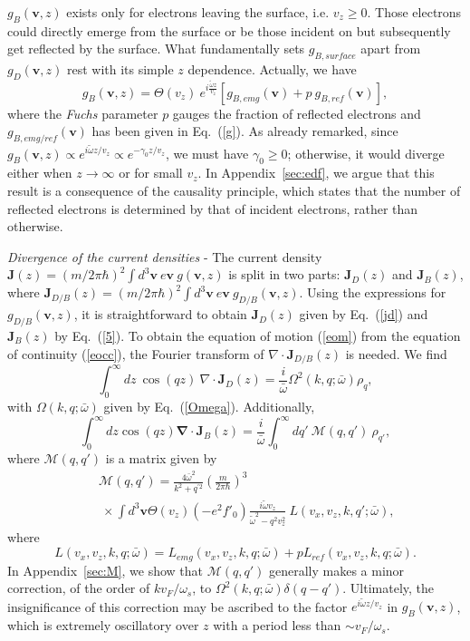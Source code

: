 \documentclass[aps,reprint]{revtex4-1}
\begin{document}
$g_{B}(\mathbf{v},z)$ exists only for electrons leaving the surface, i.e. $v_z\geq0$. Those electrons could directly emerge from the surface or be those incident on but subsequently get reflected by the surface. What fundamentally sets $g_{B,surface}$ apart from $g_D(\mathbf{v},z)$ rest with its simple $z$ dependence. Actually, we have $$g_{B}(\mathbf{v},z) = \Theta(v_z)~e^{i\frac{\tilde{\omega}z}{v_z}}\left[g_{B,emg}(\mathbf{v})+p~g_{B,ref}(\mathbf{v})\right],$$ where the \textit{Fuchs} parameter $p$ gauges the fraction of reflected electrons and $g_{B,emg/ref}(\mathbf{v})$ has been given in Eq.~(\ref{g}). As already remarked, since $g_B(\mathbf{v},z) \propto e^{i\tilde{\omega}z/v_z}\propto e^{-\gamma_0z/v_z}$, we must have $\gamma_0\geq 0$; otherwise, it would diverge either when $z\rightarrow\infty$ or for small $v_z$. In Appendix~\ref{sec:edf}, we argue that this result is a consequence of the causality principle, which states that the number of reflected electrons is determined by that of incident electrons, rather than otherwise.  

\textit{Divergence of the current densities} - The current density $\mathbf{J}(z) = (m/2\pi\hbar)^2\int d^3\mathbf{v} ~e\mathbf{v}~g(\mathbf{v},z)$ is split in two parts: $\mathbf{J}_D(z)$ and $\mathbf{J}_B(z)$, where $\mathbf{J}_{D/B}(z) = (m/2\pi\hbar)^2\int d^3\mathbf{v} ~e\mathbf{v}~g_{D/B}(\mathbf{v},z)$. Using the expressions for $g_{D/B}(\mathbf{v},z)$, it is straightforward to obtain $\mathbf{J}_D(z)$ given by Eq.~(\ref{jd}) and $\mathbf{J}_B(z)$ by Eq.~(\ref{5}). To obtain the equation of motion (\ref{eom}) from the equation of continuity (\ref{eocc}), the Fourier transform of $\nabla\cdot\mathbf{J}_{D/B}(z)$ is needed. We find
\begin{equation}
\int^{\infty}_0dz~\cos(qz)~\nabla\cdot \mathbf{J}_D(z) = \frac{i}{\bar{\omega}} \Omega^2(k,q;\bar{\omega}) \rho_q, \label{dd}
\end{equation}
with $\Omega(k,q;\bar{\omega})$ given by Eq.~(\ref{Omega}). Additionally, 
\begin{equation}
\int^{\infty}_0 dz \cos(qz) \mathbf{\nabla}\cdot \mathbf{J}_B(z) = \frac{i}{\bar{\omega}} \int^{\infty}_0dq'~\mathcal{M}(q,q')~\rho_{q'}, \label{30}
\end{equation}
where $\mathcal{M}(q,q')$ is a matrix given by
\begin{eqnarray}
&~&\mathcal{M}(q,q') = \frac{4\bar{\omega}^2}{k^2+q^{'2}}\left(\frac{m}{2\pi\hbar}\right)^3\nonumber\\ &~& ~ \times\int d^3\mathbf{v}\Theta(v_z)\left(-e^2f'_0\right)\frac{i\tilde{\omega}v_z}{\tilde{\omega}^2-q^2v^2_z}~L(v_x,v_z,k,q';\bar{\omega}),
\end{eqnarray}
where $$L(v_x,v_z,k,q;\bar{\omega}) = L_{emg}(v_x,v_z,k,q;\bar{\omega}) + pL_{ref}(v_x,v_z,k,q;\bar{\omega}).
$$ In Appendix~\ref{sec:M}, we show that $\mathcal{M}(q,q')$ generally makes a minor correction, of the order of $kv_F/\omega_s$, to $\Omega^2(k,q;\bar{\omega})\delta(q-q')$. Ultimately, the insignificance of this correction may be ascribed to the factor $e^{i\tilde{\omega}z/v_z}$ in $g_B(\mathbf{v},z)$, which is extremely oscillatory over $z$ with a period less than $\sim v_F/\omega_s$.
\end{document}
